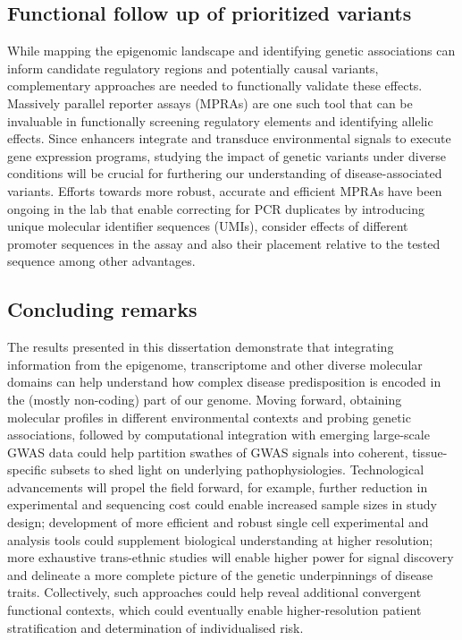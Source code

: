 \subsection{Functional follow up of prioritized variants}
While mapping the epigenomic landscape and identifying genetic associations can inform candidate regulatory regions and potentially causal variants, complementary approaches are needed to functionally validate these effects. Massively parallel reporter assays (MPRAs) are one such tool that can be invaluable in functionally screening regulatory elements and identifying allelic effects. Since enhancers integrate and transduce environmental signals to execute gene expression programs, studying the impact of genetic variants under diverse conditions will be crucial for furthering our understanding of disease-associated variants. Efforts towards more robust, accurate and efficient MPRAs have been ongoing in the lab that enable correcting for PCR duplicates by introducing unique molecular identifier sequences (UMIs), consider effects of different promoter sequences in the assay and also their placement relative to the tested sequence among other advantages.


\subsection{Concluding remarks}
The results presented in this dissertation demonstrate that integrating information from the epigenome, transcriptome and other diverse molecular domains can help understand how complex disease predisposition is encoded in the (mostly non-coding) part of our genome. Moving forward, obtaining molecular profiles in different environmental contexts and probing genetic associations, followed by computational integration with emerging large-scale GWAS data could help partition swathes of GWAS signals into coherent, tissue-specific subsets to shed light on underlying pathophysiologies. Technological advancements will propel the field forward, for example, further reduction in experimental and sequencing cost could enable increased sample sizes in study design; development of more efficient and robust single cell experimental and analysis tools could supplement biological understanding at higher resolution; more exhaustive trans-ethnic studies will enable higher power for signal discovery and delineate a more complete picture of the genetic underpinnings of disease traits. Collectively, such approaches could help reveal additional convergent functional contexts, which could eventually enable higher-resolution patient stratification and determination of individualised risk.